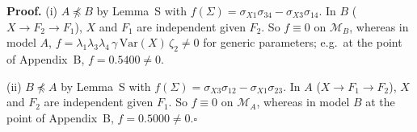\documentclass[10pt,a4paper]{article}
\newcommand{\nnest}{\not\preceq}
\begin{document}
\noindent\textbf{Proof.} (i) $A\nnest B$ by Lemma~S with $f(\Sigma)=\sigma_{X1}\sigma_{34} - \sigma_{X3}\sigma_{14}$. In $B$ ($X\to F_2\to F_1$), $X$ and $F_1$ are independent given $F_2$. So $f\equiv0$ on $\mathcal M_B$, whereas in model $A$, $f=\lambda_1\lambda_3\lambda_4\,\gamma\,\mathrm{Var}(X)\,\zeta_2\neq0$ for generic parameters; e.g.\ at the point of Appendix~B, $f=0.5400\neq0$.\par\smallskip
\noindent(ii) $B\nnest A$ by Lemma~S with $f(\Sigma)=\sigma_{X3}\sigma_{12} - \sigma_{X1}\sigma_{23}$. In $A$ ($X\to F_1\to F_2$), $X$ and $F_2$ are independent given $F_1$. So $f\equiv0$ on $\mathcal M_A$, whereas in model $B$ at the point of Appendix~B, $f=0.5000\neq0$.\hfill$\square$\par\medskip
{}

\clearpage
\end{document}
